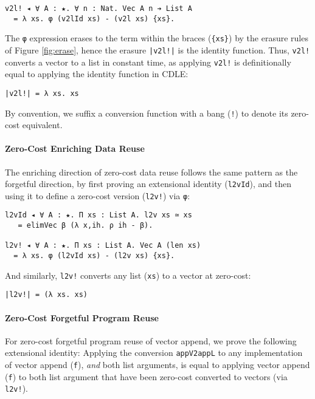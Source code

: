 \documentclass[acmsmall]{acmart}\settopmatter{}
\newcommand{\reffig}[1]{Figure \ref{fig:#1}}
\begin{document}
\begin{verbatim}
v2l! ◂ ∀ A : ★. ∀ n : Nat. Vec A n ➔ List A
  = λ xs. φ (v2lId xs) - (v2l xs) {xs}.
\end{verbatim}
The \verb;φ; expression erases to the term within the braces
(\verb;{xs};) by the erasure rules of \reffig{erase}, hence
the erasure \verb;|v2l!|; is the identity function.
Thus, \verb;v2l!; converts a vector to a list in
constant time, as applying \verb;v2l!; is definitionally equal to
applying the identity function in CDLE:

\begin{verbatim}
|v2l!| = λ xs. xs
\end{verbatim}
By convention, we suffix a
conversion function with a bang (\verb;!;) to denote its zero-cost
equivalent.

\paragraph{Zero-Cost Enriching Data Reuse}

The enriching direction of zero-cost data reuse follows the same
pattern as the forgetful direction, by first proving an extensional identity
(\verb;l2vId;), and then using it to define a zero-cost version
(\verb;l2v!;) via \verb;φ;:

\begin{verbatim}
l2vId ◂ ∀ A : ★. Π xs : List A. l2v xs ≃ xs
   = elimVec β (λ x,ih. ρ ih - β).

l2v! ◂ ∀ A : ★. Π xs : List A. Vec A (len xs)
  = λ xs. φ (l2vId xs) - (l2v xs) {xs}.
\end{verbatim}
And similarly, \verb;l2v!; converts any list (\verb;xs;)
to a vector at zero-cost:

\begin{verbatim}
|l2v!| = (λ xs. xs)
\end{verbatim}

\paragraph{Zero-Cost Forgetful Program Reuse}

For zero-cost forgetful program reuse of vector append, we prove
the following extensional identity:
Applying the conversion \verb;appV2appL; to any implementation of
vector append (\verb;f;), \textit{and} both list arguments, is equal
to applying vector append (\verb;f;) to both list argument that have been
zero-cost converted to vectors (via \verb;l2v!;).
\end{document}
